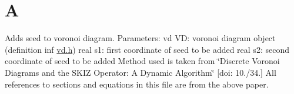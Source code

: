 \hypertarget{group__A}{}\section{A}
\label{group__A}
Adds seed to voronoi diagram. Parameters\+: vd VD\+: voronoi diagram object (definition inf \mbox{\hyperlink{vd_8h_source}{vd.\+h}}) real s1\+: first coordinate of seed to be added real s2\+: second coordinate of seed to be added Method used is taken from \char`\"{}\+Discrete Voronoi Diagrams and the S\+K\+I\+Z
 Operator\+: A Dynamic Algorithm\char`\"{} \mbox{[}doi\+: 10./34.\mbox{]} All references to sections and equations in this file are from the above paper. 